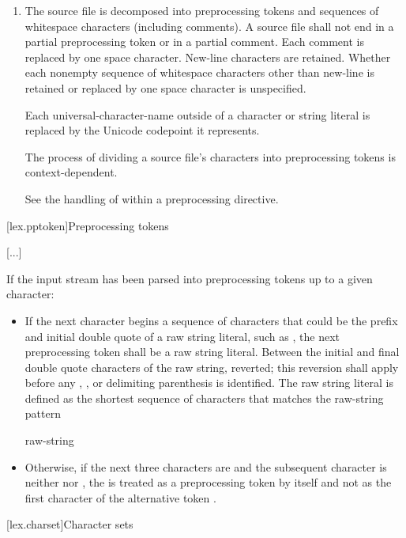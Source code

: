 \documentclass{wg21}
\begin{document}
\begin{enumerate}
\item The source file is decomposed into preprocessing
tokens and sequences of whitespace characters
(including comments). A source file shall not end in a partial
preprocessing token or in a partial comment.
Each comment is replaced by one space character. New-line characters are
retained. Whether each nonempty sequence of whitespace characters other
than new-line is retained or replaced by one space character is
unspecified.
\begin{addedblock}
Each universal-character-name outside of a character or string literal is replaced by the Unicode codepoint it represents.
\end{addedblock}

The process of dividing a source file's
characters into preprocessing tokens is context-dependent.
\begin{example}
    See the handling of \tcode{<} within a  preprocessing
    directive.
\end{example}

\end{enumerate}

[lex.pptoken]{Preprocessing tokens}

[...]

\pnum
If the input stream has been parsed into preprocessing tokens up to a
given character:
\begin{itemize}
    \item
    If the next character begins a sequence of characters that could be the prefix
    and initial double quote of a raw string literal, such as , the next preprocessing
    token shall be a raw string literal. Between the initial and final
    double quote characters of the raw string,  reverted; this reversion
    shall apply before any , , or delimiting
    parenthesis is identified. The raw string literal is defined as the shortest sequence
    of characters that matches the raw-string pattern
\begin{ncbnf}  raw-string\end{ncbnf}
    
    \item Otherwise, if the next three characters are \tcode{<::} and the subsequent character
    is neither \tcode{:} nor \tcode{>}, the \tcode{<} is treated as a preprocessing token by
    itself and not as the first character of the alternative token \tcode{<:}.
\end{itemize}
[lex.charset]{Character sets}
\end{document}
